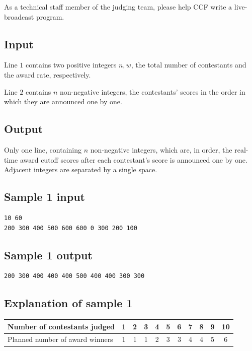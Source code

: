 \documentclass[11pt]{article}
\begin{document}
As a technical staff member of the judging team, please help CCF write a
live-broadcast program.

\subsection*{Input}

Line $1$ contains two positive integers $n, w$, the total number of
contestants and the award rate, respectively.

Line $2$ contains $n$ non-negative integers, the contestants' scores in
the order in which they are announced one by one.

\subsection*{Output}

Only one line, containing $n$ non-negative integers, which are, in order,
the real-time award cutoff scores after each contestant's score is
announced one by one.
Adjacent integers are separated by a single space.

\subsection*{Sample 1 input}

\begin{verbatim}
10 60
200 300 400 500 600 600 0 300 200 100
\end{verbatim}

\subsection*{Sample 1 output}

\begin{verbatim}
200 300 400 400 400 500 400 400 300 300
\end{verbatim}

\subsection*{Explanation of sample 1}

\begin{center}
\begin{tabular}{|l|c|c|c|c|c|c|c|c|c|c|}
\hline
Number of contestants judged & 1 & 2 & 3 & 4 & 5 & 6 & 7 & 8 & 9 & 10 \\
\hline
Planned number of award winners & 1 & 1 & 1 & 2 & 3 & 3 & 4 & 4 & 5 & 6 \\
\hline
\end{tabular}
\end{center}
\end{document}
